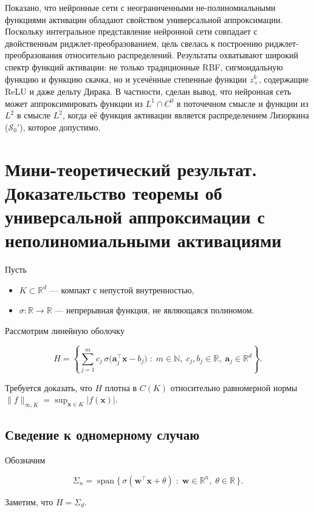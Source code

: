 \documentclass[12pt]{article}
\DeclareMathOperator{\SpanOp}{span}
\begin{document}
Показано, что нейронные сети с неограниченными не-полиномиальными функциями активации обладают свойством универсальной аппроксимации. Поскольку интегральное представление нейронной сети совпадает с двойственным риджлет-преобразованием, цель свелась к построению риджлет-преобразования относительно распределений. Результаты охватывают широкий спектр функций активации: не только традиционные RBF, сигмоидальную функцию и функцию скачка, но и усечённые степенные функции \( z_+^k \), содержащие ReLU и даже дельту Дирака. В частности, сделан вывод, что нейронная сеть может аппроксимировать функции из \( L^1 \cap C^0 \) в поточечном смысле и функции из \( L^2 \) в смысле \( L^2 \), когда её функция активации является распределением Лизоркина (\( \mathcal{S}_0' \)), которое допустимо.
	
	\section{Мини-теоретический результат. Доказательство теоремы об универсальной аппроксимации с неполиномиальными активациями}
	
	Пусть
	
	\begin{itemize}
		\item $K \subset \mathbb{R}^d$ --- компакт с непустой внутренностью,
		\item $\sigma : \mathbb{R} \to \mathbb{R}$ --- непрерывная функция, не являющаяся полиномом.
	\end{itemize}
	
	Рассмотрим линейную оболочку
	
	\[
	H = \left\{ \sum_{j=1}^{m} c_j \, \sigma\bigl( \mathbf{a}_j^{\!\top} \mathbf{x} - b_j \bigr) 
	\;:\; m \in \mathbb{N},\; 
	c_j, b_j \in \mathbb{R},\; 
	\mathbf{a}_j \in \mathbb{R}^d \right\}.
	\]
	
	Требуется доказать, что $H$ плотна в $C(K)$ относительно равномерной нормы
	$\|f\|_{\infty,K} = \sup_{\mathbf{x} \in K} |f(\mathbf{x})|$.
	
	\subsection{Сведение к одномерному случаю}
	
	Обозначим
	
	\[
	\Sigma_n = \SpanOp\{\, \sigma(\mathbf{w}^{\!\top}\mathbf{x} + \theta) \;:\; \mathbf{w} \in \mathbb{R}^n,\; \theta \in \mathbb{R}\,\}.
	\]
	
	Заметим, что $H = \Sigma_d$.
	
\end{document}
